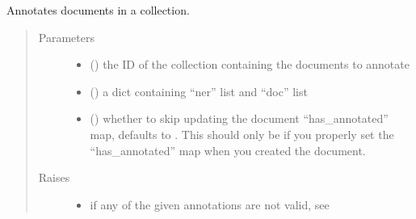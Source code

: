 \documentclass[letterpaper,10pt,english]{sphinxmanual}
\begin{document}
\begin{fulllineitems}
\begin{fulllineitems}
\label{\detokenize{autoapi/pine/client/client/index:pine.client.client.PineClient.annotate_collection_documents}}
Annotates documents in a collection.
\begin{quote}\begin{description}
\item[{Parameters}] \leavevmode\begin{itemize}
\item {} 
 () \textendash{} the ID of the collection containing the documents to annotate

\item {} 
 () \textendash{} a dict containing “ner” list and “doc” list

\item {} 
 () \textendash{} whether to skip updating the document “has\_annotated” map, defaults to .
This should only be  if you properly set the
“has\_annotated” map when you created the document.

\end{itemize}

\item[{Raises}] \leavevmode\begin{itemize}
\item {} 
{\hyperref[\detokenize{autoapi/pine/client/exceptions/index:pine.client.exceptions.PineClientValueException}]{}} \textendash{} if any of the given annotations are not valid, see {\hyperref[\detokenize{autoapi/pine/client/models/index:pine.client.models.is_valid_doc_annotations}]{}}


\end{itemize}
\end{description}
\end{quote}
\end{fulllineitems}
\end{fulllineitems}
\end{document}
